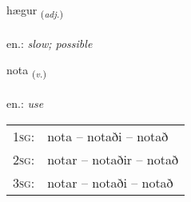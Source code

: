 \documentclass[frontgrid, backgrid]{flacards}\usepackage[]{graphicx}\usepackage[]{xcolor}
\begin{document}
{hægur \small{\textsubscript{(\textit{adj.})}} \\[1ex] %
\textphonetic{[haiːɣʏr]} \\
en.: \emph{slow; possible} \\  [2ex]
\renewcommand*{\arraystretch}{0.8}
}

\renewcommand{\flhead}{\vskip5pt \fboxsep=0pt {\small\bfseries\footnotesize Sagnorð | Verb}}
\renewcommand{\fcfoot}{\vskip5pt \fboxsep=0pt \hspace{2pt}{\small\bfseries\footnotesize 1K}}

\renewcommand{\blhead}{\vskip5pt {\small\bfseries\footnotesize Sagnorð | Verb }}
\renewcommand{\bcfoot}{\vskip5pt \hspace{2pt}{\small\bfseries\footnotesize 1K}}


{nota \small{\textsubscript{(\textit{v.})}} \\[1ex] %
\textphonetic{[nɔːta]} \\
en.: \emph{use} \\  [2ex]
\renewcommand*{\arraystretch}{0.8}
\begin{tabular}{p{1cm}l}
\textsc{1sg}: & nota -- notaði -- notað \\ 
\textsc{2sg}: & notar -- notaðir -- notað \\ 
\textsc{3sg}: & notar -- notaði -- notað \\ 
\end{tabular}
}

\renewcommand{\flhead}{\vskip5pt \fboxsep=0pt {\small\bfseries\footnotesize Fornafn | Pronoun}}
\renewcommand{\fcfoot}{\vskip5pt \fboxsep=0pt \hspace{2pt}{\small\bfseries\footnotesize 1K}}
\end{document}

